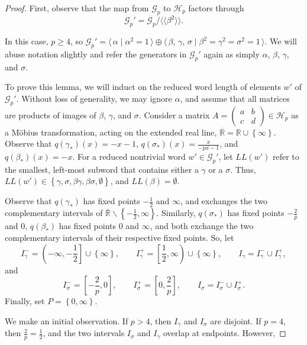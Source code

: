 \documentclass[10pt,a4paper]{amsart}
\newcommand{\rmv}{\smallsetminus}
\newcommand{\set}[1]{ \left\{ #1 \right\} }
\begin{document}
\begin{proof} First, observe that the map from $\mathcal{G}_p$ to $\mathcal{H}_p$ factors through \[\mathcal{G}_p'  = \mathcal{G}_p / \langle \langle \beta^2 \rangle \rangle. \]


In this case, $p \geq 4$, so $\mathcal{G}_p' = \langle \, \alpha \mid \alpha^2 = 1 \, \rangle \oplus \langle \, \beta, \, \gamma, \, \sigma \mid \beta^2 = \gamma^2 = \sigma^2= 1 \, \rangle$. We will abuse notation slightly and refer the generators in $\mathcal{G}_p'$ again as simply $\alpha$, $\beta$, $\gamma$, and $\sigma$.

To prove this lemma, we will induct on the reduced word length of elements $w'$ of $\mathcal{G}_p'$. Without loss of generality, we may ignore $\alpha$, and assume that all matrices are products of images of $\beta$, $\gamma$, and $\sigma$. Consider a matrix $A = \begin{pmatrix} a & b \\ c & d \end{pmatrix} \in \mathcal{H}_p$ as a M\"{o}bius transformation, acting on the extended real line, $\overline{\mathbb{R}} = \mathbb{R} \cup \set{\infty}$. Observe that $q(\gamma_*)(x) = -x - 1$, $q(\sigma_*)(x) = \frac{x}{-px - 1}$, and $q(\beta_*)(x) = -x$. For a reduced nontrivial word $w' \in \mathcal{G}_p'$, let $LL(w')$ refer to the smallest, left-most subword that contains either a $\gamma$ or a $\sigma$. Thus, $LL(w') \in \set{\gamma, \sigma, \beta \gamma, \beta \sigma, \emptyset }$, and $LL(\beta) = \emptyset$. 

Observe that $q(\gamma_*)$ has fixed points $-\frac{1}{2}$ and $\infty$, and exchanges the two complementary intervals of $\overline{\mathbb{R}} \rmv \set{-\frac{1}{2}, \infty}$. Similarly, $q(\sigma_*)$ has fixed points $-\frac{2}{p}$ and $0$,  $q(\beta_*)$ has fixed points $0$ and $\infty$, and both exchange the two complementary intervals of their respective fixed points. So, let 
\[ I_\gamma^- = \left( -\infty, -\frac{1}{2} \right] \cup \set{\infty}, \qquad I_\gamma^+ = \left[\frac{1}{2}, \infty \right) \cup \set{\infty}, \qquad I_\gamma  = I_\gamma^- \cup I_\gamma^+,  \]
%
and
%
\[ I_\sigma^- = \left[ -\frac{2}{p}, 0 \right], \qquad I_\sigma^+ = \left[ 0, \frac{2}{p} \right], \qquad I_\sigma = I_\sigma^- \cup I_\sigma^+.\]
%
Finally, set $P = \set{0, \infty}$.

We make an initial observation. If $p > 4$, then $I_\gamma$ and $I_\sigma$ are disjoint. If $p = 4$, then $\frac{2}{p} = \frac{1}{2}$, and the two intervals $I_\sigma$ and $I_\gamma$ overlap at endpoints. However,


\end{proof}
\end{document}
